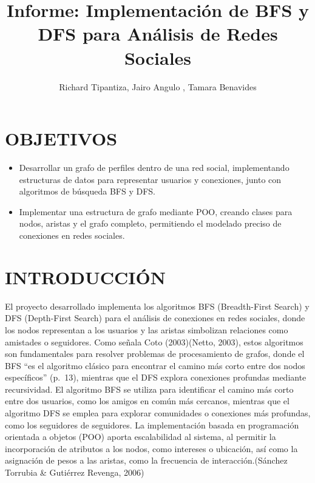 \documentclass[
  spanish,
  letterpaper,
  DIV=11,
  numbers=noendperiod]{scrartcl}
\title{Informe: Implementación de BFS y DFS para Análisis de Redes
Sociales}
\author{Richard Tipantiza, Jairo Angulo , Tamara Benavides}
\date{}
\renewcommand*\contentsname{Tabla de contenidos}
\newcommand\contentsname{Tabla de contenidos}
\begin{document}
\maketitle

\renewcommand*\contentsname{Tabla de Contenidos}
{
\hypersetup{linkcolor=}
\setcounter{tocdepth}{3}
\tableofcontents
}

\section{OBJETIVOS}\label{objetivos}

\begin{itemize}
\item
  Desarrollar un grafo de perfiles dentro de una red social,
  implementando estructuras de datos para representar usuarios y
  conexiones, junto con algoritmos de búsqueda BFS y DFS.
\item
  Implementar una estructura de grafo mediante POO, creando clases para
  nodos, aristas y el grafo completo, permitiendo el modelado preciso de
  conexiones en redes sociales.
\end{itemize}

\section{INTRODUCCIÓN}\label{introducciuxf3n}

El proyecto desarrollado implementa los algoritmos BFS (Breadth-First
Search) y DFS (Depth-First Search) para el análisis de conexiones en
redes sociales, donde los nodos representan a los usuarios y las aristas
simbolizan relaciones como amistades o seguidores. Como señala Coto
(2003)(Netto, 2003), estos algoritmos son fundamentales para resolver
problemas de procesamiento de grafos, donde el BFS ``es el algoritmo
clásico para encontrar el camino más corto entre dos nodos específicos''
(p.~13), mientras que el DFS explora conexiones profundas mediante
recursividad. El algoritmo BFS se utiliza para identificar el camino más
corto entre dos usuarios, como los amigos en común más cercanos,
mientras que el algoritmo DFS se emplea para explorar comunidades o
conexiones más profundas, como los seguidores de seguidores. La
implementación basada en programación orientada a objetos (POO) aporta
escalabilidad al sistema, al permitir la incorporación de atributos a
los nodos, como intereses o ubicación, así como la asignación de pesos a
las aristas, como la frecuencia de interacción.(Sánchez Torrubia \&
Gutiérrez Revenga, 2006)
\end{document}
